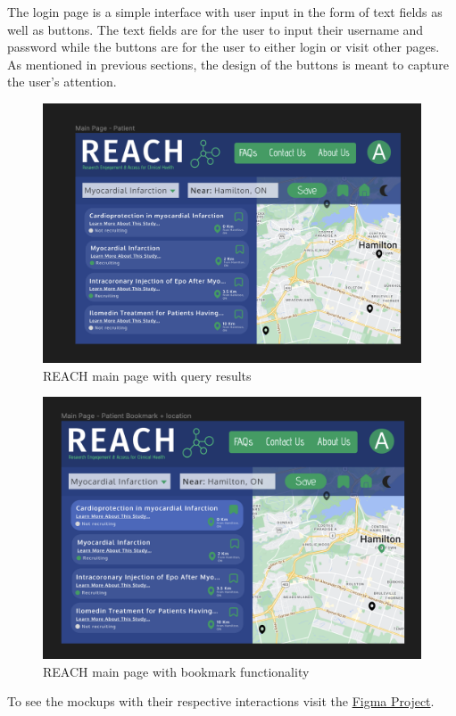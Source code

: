 \documentclass[12pt, titlepage]{article}
\begin{document}
The login page is a simple interface with user input in the form of text fields
 as well as buttons. The text fields are for the user to input their username and password
 while the buttons are for the user to either login or visit other pages.
 As mentioned in previous sections, the design
 of the buttons is meant to capture the user's attention.

\begin{figure}[H]
  \centering
  \includegraphics[width=0.9\linewidth]{images/MainPage.png}
  \caption{REACH main page with query results}
  \label{fig:figure3}
\end{figure}
\begin{figure}[H]
  \centering
  \includegraphics[width=0.9\linewidth]{images/Bookmark.png}
  \caption{REACH main page with bookmark functionality}
  \label{fig:figure4}
\end{figure}


To see the mockups with their respective interactions visit the \href{https://www.figma.com/file/58wCxZa5xulKIIYw8eX8Pr/REACH-Trial-Functionality?type=design&node-id=0%3A1&mode=design&t=ff0O5TWpZokg19Q8-1}{Figma Project}.
\end{document}
